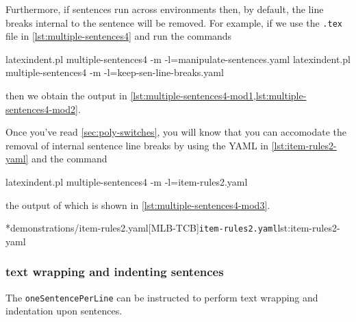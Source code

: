 	Furthermore, if sentences run across environments then, by default, the line breaks
	internal to the sentence will be removed. For example, if we use the
	\texttt{.tex} file in \cref{lst:multiple-sentences4} and run the commands
	\begin{commandshell}
latexindent.pl multiple-sentences4 -m -l=manipulate-sentences.yaml
latexindent.pl multiple-sentences4 -m -l=keep-sen-line-breaks.yaml
	\end{commandshell}
	then we obtain the output in \cref{lst:multiple-sentences4-mod1,lst:multiple-sentences4-mod2}. 
	\begin{widepage}
	\end{widepage}
	Once you've read \cref{sec:poly-switches}, you will know that you can accomodate the
	removal of internal sentence line breaks by using the YAML in \cref{lst:item-rules2-yaml}
	and the command
	\begin{commandshell}
latexindent.pl multiple-sentences4 -m -l=item-rules2.yaml
	\end{commandshell}
	the output of which is shown in \cref{lst:multiple-sentences4-mod3}.

	\begin{minipage}{.5\linewidth}
	\end{minipage}
	\hfill
	\begin{minipage}{.5\linewidth}
		\cmhlistingsfromfile[style=yaml-LST]*{demonstrations/item-rules2.yaml}[MLB-TCB]{\texttt{item-rules2.yaml}}{lst:item-rules2-yaml}
	\end{minipage}

\subsubsection{text wrapping and indenting sentences}
	The \texttt{oneSentencePerLine}%
	 can be instructed to perform
	text wrapping and indentation upon sentences.


